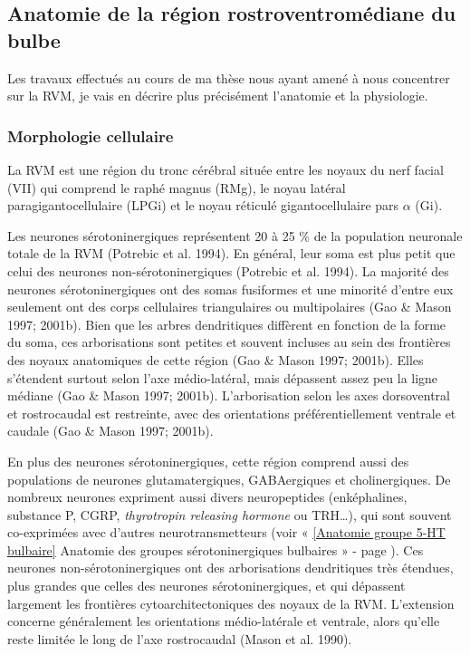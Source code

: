 \documentclass[a4paper,12pt,twoside]{report}
\begin{document}
\subsection{Anatomie de la région rostroventromédiane du bulbe}
\label{Anatomie RVM}

Les travaux effectués au cours de ma thèse nous ayant amené à nous concentrer sur la RVM, je vais en décrire plus précisément l’anatomie et la physiologie.

\subsubsection{Morphologie cellulaire}

La RVM est une région du tronc cérébral située entre les noyaux du nerf facial (VII) qui comprend le raphé magnus (RMg), le noyau latéral paragigantocellulaire (LPGi) et le noyau réticulé gigantocellulaire pars $\alpha$ (Gi).

Les neurones sérotoninergiques représentent 20 à 25 \% de la population neuronale totale de la RVM (Potrebic et al. 1994). En général, leur soma est plus petit que celui des neurones non-sérotoninergiques (Potrebic et al. 1994). La majorité des neurones sérotoninergiques ont des somas fusiformes et une minorité d’entre eux seulement ont des corps cellulaires triangulaires ou multipolaires (Gao \& Mason 1997; 2001b). Bien que les arbres dendritiques diffèrent en fonction de la forme du soma, ces arborisations sont petites et souvent incluses au sein des frontières des noyaux anatomiques de cette région (Gao \& Mason 1997; 2001b). Elles s’étendent surtout selon l’axe médio-latéral, mais dépassent assez peu la ligne médiane (Gao \& Mason 1997; 2001b). L’arborisation selon les axes dorsoventral et rostrocaudal est restreinte, avec des orientations préférentiellement ventrale et caudale (Gao \& Mason 1997; 2001b).

En plus des neurones sérotoninergiques, cette région comprend aussi des populations de neurones glutamatergiques, GABAergiques et cholinergiques. De nombreux neurones expriment aussi divers neuropeptides (enképhalines, substance P, CGRP, \textit{thyrotropin releasing hormone} ou TRH\ldots), qui sont souvent co-exprimées avec d’autres neurotransmetteurs (voir « \ref{Anatomie groupe 5-HT bulbaire} Anatomie des groupes sérotoninergiques bulbaires » - page \pageref{Anatomie groupe 5-HT bulbaire}). Ces neurones non-sérotoninergiques ont des arborisations dendritiques très étendues, plus grandes que celles des neurones sérotoninergiques, et qui dépassent largement les frontières cytoarchitectoniques des noyaux de la RVM. L’extension concerne généralement les orientations médio-latérale et ventrale, alors qu’elle reste limitée le long de l’axe rostrocaudal (Mason et al. 1990). 
\end{document}

